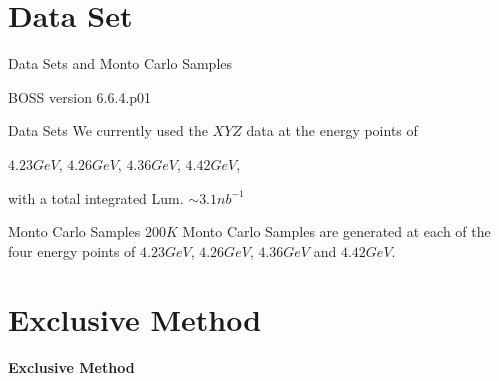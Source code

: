 \documentclass{beamer}
\begin{document}
\section{Data Set}
\begin{frame}{Data Sets and Monto Carlo Samples}
    \begin{block}{BOSS version}
        6.6.4.p01
    \end{block}
    \begin{block}{Data Sets}
        We currently used the $XYZ$ data at the energy points of\\
        \begin{center}
            $4.23 GeV$, $4.26 GeV$, $4.36 GeV$, $4.42 GeV$,\\
        \end{center}
        with a total integrated Lum. $\sim 3.1 nb^{-1} $
    \end{block}
    \begin{block}{Monto Carlo Samples}
        $200 K$ Monto Carlo Samples are generated at each of the four energy points of $4.23 GeV$, $4.26 GeV$, $4.36 GeV$ and $4.42 GeV$.
    \end{block}
\end{frame}
\section{Exclusive Method}
\begin{frame}
    \begin{center}
        \Huge{\bf Exclusive Method}
    \end{center}
\end{frame}
\end{document}
